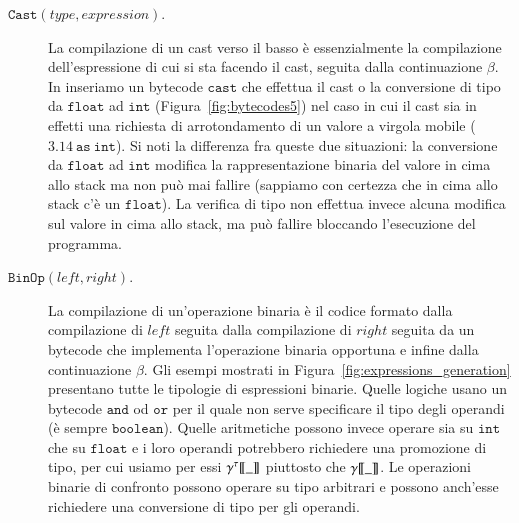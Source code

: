 \begin{description}
\item[\underline{$\mathtt{Cast(\mathit{type},\mathit{expression})}$}.]
  La compilazione di un cast verso il basso \`e essenzialmente la compilazione
  dell'espressione di cui si sta facendo il cast, seguita dalla continuazione
  $\beta$. In \piu inseriamo un bytecode $\mathtt{cast}$
  che effettua il cast o la conversione di tipo da
  $\mathtt{float}$ ad $\mathtt{int}$ (Figura~\ref{fig:bytecodes5})
  nel caso in cui il cast sia in effetti
  una richiesta di arrotondamento di un valore a virgola mobile
  ($\mathtt{3.14\ as\ int}$). Si noti la differenza fra queste due
  situazioni: la conversione da $\mathtt{float}$ ad $\mathtt{int}$
  modifica la rappresentazione binaria del valore in cima allo stack ma
  non pu\`o mai fallire (sappiamo con certezza che in cima allo stack
  c'\`e un $\mathtt{float}$). La verifica di tipo non effettua invece
  alcuna modifica sul valore in cima allo stack, ma pu\`o fallire
  bloccando l'esecuzione del programma.
\item[\underline{$\mathtt{BinOp(\mathit{left},\mathit{right})}$}.]
  La compilazione di un'operazione binaria \`e il codice formato
  dalla compilazione di $\mathit{left}$ seguita dalla compilazione
  di $\mathit{right}$ seguita da un bytecode che implementa
  l'operazione binaria opportuna e infine dalla continuazione $\beta$.
  Gli esempi mostrati in Figura~\ref{fig:expressions_generation}
  presentano tutte le tipologie di espressioni binarie.
  Quelle logiche usano un bytecode $\mathtt{and}$ od $\mathtt{or}$ per
  il quale non serve specificare il tipo degli operandi (\`e sempre
  $\mathtt{boolean}$). Quelle aritmetiche possono invece
  operare sia su $\mathtt{int}$ che su $\mathtt{float}$ e i loro
  operandi potrebbero richiedere una promozione di tipo, per cui usiamo
  per essi ${\gamma^{{\tau}}[\![{\_}]\!]}$ piuttosto che ${\gamma[\![{\_}]\!]}$. Le operazioni
  binarie di confronto possono operare su tipo arbitrari e possono
  anch'esse richiedere una conversione di tipo per gli operandi.
\end{description}

